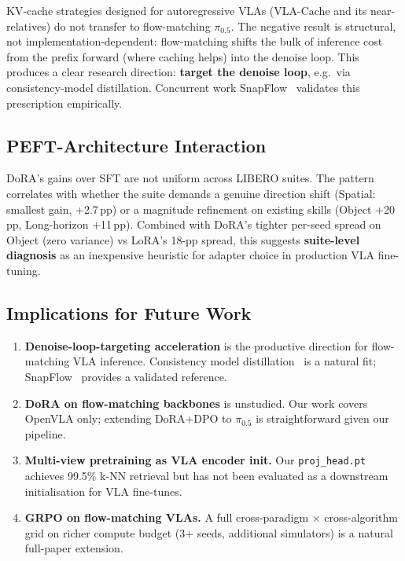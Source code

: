 \documentclass{article}
\begin{document}
KV-cache strategies designed for autoregressive VLAs (VLA-Cache and its near-relatives) do not transfer to flow-matching \(\pi_{0.5}\). The negative result is structural, not implementation-dependent: flow-matching shifts the bulk of inference cost from the prefix forward (where caching helps) into the denoise loop. This produces a clear research direction: \textbf{target the denoise loop}, e.g.\ via consistency-model distillation. Concurrent work SnapFlow~\cite{snapflow2026} validates this prescription empirically.

\subsection{PEFT-Architecture Interaction}

DoRA's gains over SFT are not uniform across LIBERO suites. The pattern correlates with whether the suite demands a genuine direction shift (Spatial: smallest gain, +2.7\,pp) or a magnitude refinement on existing skills (Object +20\,pp, Long-horizon +11\,pp). Combined with DoRA's tighter per-seed spread on Object (zero variance) vs LoRA's 18-pp spread, this suggests \textbf{suite-level diagnosis} as an inexpensive heuristic for adapter choice in production VLA fine-tuning.

\subsection{Implications for Future Work}

\begin{enumerate}
  \item \textbf{Denoise-loop-targeting acceleration} is the productive direction for flow-matching VLA inference. Consistency model distillation~\cite{salimans2022progressive} is a natural fit; SnapFlow~\cite{snapflow2026} provides a validated reference.
  \item \textbf{DoRA on flow-matching backbones} is unstudied. Our work covers OpenVLA only; extending DoRA+DPO to \(\pi_{0.5}\) is straightforward given our pipeline.
  \item \textbf{Multi-view pretraining as VLA encoder init.} Our \texttt{proj\_head.pt} achieves 99.5\% k-NN retrieval but has not been evaluated as a downstream initialisation for VLA fine-tunes.
  \item \textbf{GRPO on flow-matching VLAs.} A full cross-paradigm \(\times\) cross-algorithm grid on richer compute budget (3+ seeds, additional simulators) is a natural full-paper extension.
\end{enumerate}
\end{document}
